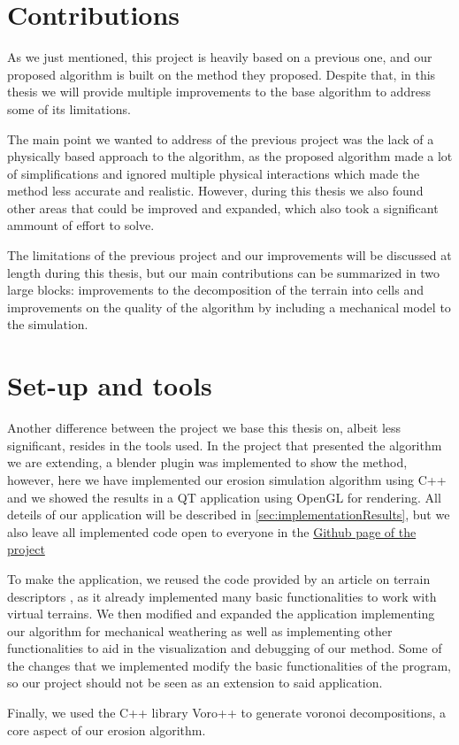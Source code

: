 \section{Contributions}

As we just mentioned, this project is heavily based on a previous one, and
our proposed algorithm is built on the method they proposed. Despite that, 
in this thesis we will provide 
multiple improvements to the base algorithm to address some of its limitations. 

\vspace{10pt}

The main point we wanted to address of the previous project was the lack of
a physically based approach to the algorithm, as the proposed algorithm
made a lot of simplifications and ignored multiple physical interactions 
which made the method less accurate and realistic. However, during this 
thesis we also found other areas that could be improved and expanded, 
which also took a significant ammount of effort to solve.

\vspace{10pt}

The limitations of the previous project and our improvements will be 
discussed at length during this thesis, but our main contributions can
be summarized in two large blocks: improvements to the decomposition of 
the terrain into cells and
improvements on the quality of the algorithm by including a mechanical 
model to the simulation.  

\section{Set-up and tools}

Another difference between the project we base this thesis on, albeit less
significant, resides in the tools used. In the project that presented the algorithm we 
are extending, a blender plugin was implemented to show the method, however, 
here we have implemented our erosion simulation algorithm using C++ and we showed the 
results in a QT application using OpenGL for rendering. All deteils of our 
application will be described in \ref{sec:implementationResults}, but 
we also leave all implemented code open to everyone in the \href{https://github.com/Lluna-CC/Modeling-Erosion}{Github page of the project}

\vspace{10pt}

To make the application, we reused the code provided by an article on 
terrain descriptors \cite{Argudo2025descriptors}, as it already 
implemented many basic functionalities to work with virtual terrains. We
then modified and expanded the application implementing our algorithm for 
mechanical weathering as well as implementing other functionalities to aid in the 
visualization and debugging of our method. Some of the changes that we 
implemented modify the basic functionalities of the program, so 
our project should not be seen as an extension to said application.

\vspace{10pt}

Finally, we used the C++ library Voro++ \cite{osti_code-54674} to generate 
voronoi decompositions, a core aspect of our erosion algorithm. 